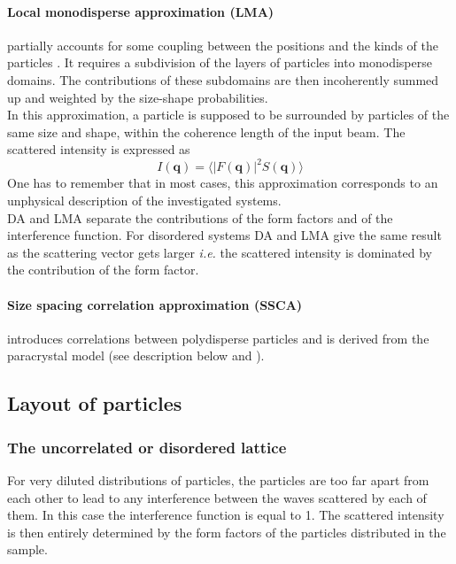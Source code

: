  
\paragraph{Local monodisperse approximation (LMA)} partially accounts for some coupling between the positions and the kinds of the particles \cite{Pede94}. 
 It requires a subdivision of the layers of particles into monodisperse domains. The contributions of these subdomains are then  incoherently summed up and weighted by the size-shape probabilities.\\ In this approximation, a particle is supposed to be surrounded by particles of the same size and shape, within the coherence length of the input beam. The scattered intensity is expressed as
\begin{equation*}
I(\mathbf{q})= \langle |F(\mathbf{q})|^2   S(\mathbf{q}) \rangle 
\end{equation*}
One has to remember that in most cases, this approximation corresponds to an unphysical description of the investigated systems. \\ 

DA and LMA separate the contributions of the form factors and of the interference function. For disordered systems DA and LMA give the same result as the scattering vector gets larger \textit{i.e.} the scattered intensity is dominated by the contribution of the form factor.

\paragraph{Size spacing correlation approximation (SSCA)} introduces correlations between polydisperse particles and is derived from the paracrystal model (see description below and \cite{LeLa04}).

\subsection{Layout of particles}\label{sec:partlayout}


\subsubsection{The uncorrelated or disordered lattice}
For very diluted distributions of particles, the particles are too far apart from each other to lead to any interference between the waves scattered by each of them. In this case the interference function is equal to 1. The scattered intensity is then entirely determined by the form factors of the particles distributed in the sample.

